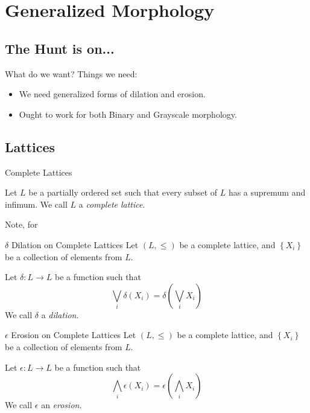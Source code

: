 \documentclass{beamer}
\newcommand{\set}[1]{\left\lbrace #1 \right\rbrace}
\newcommand{\func}[3]{#1:#2\rightarrow#3}
\newcommand{\meet}[1]{\bigwedge_{#1}}
\newcommand{\join}[1]{\bigvee_{#1}}
\newcommand{\unidilate}{\delta}
\newcommand{\unierode}{\epsilon}
\newcommand{\partialless}{\leqslant}
\begin{document}
\section{Generalized Morphology}
\subsection{The Hunt is on...}
\begin{frame}{What do we want?}
  Things we need:
  \begin{itemize}
    \item We need generalized forms of dilation and erosion.
    \item Ought to work for both Binary and Grayscale morphology.
  \end{itemize} 
\end{frame}

\subsection{Lattices}
\begin{frame}{Complete Lattices}
  \begin{definition}
    Let $L$ be a partially ordered set such that 
    every subset of $L$ has a supremum and infimum. 
    We call $L$ a \emph{complete lattice}.
  \end{definition}
  Note, for 
\end{frame}
\begin{frame}{$\unidilate$ Dilation on Complete Lattices}
   Let $(L, \partialless)$ be a complete lattice, and $\set{X_i}$ be
   a collection of elements from $L$.
   \begin{definition}
     Let $\func{\unidilate}{L}{L}$ be a function such that
       $$\join{i} \unidilate(X_i) = 
         \unidilate\left(\join{i}X_i\right)$$
     We call $\unidilate$ a \emph{dilation}.
   \end{definition}
\end{frame}

\begin{frame}{$\unierode$ Erosion on Complete Lattices}
   Let $(L, \partialless)$ be a complete lattice, and $\set{X_i}$ be
   a collection of elements from $L$.
   \begin{definition}
     Let $\func{\unierode}{L}{L}$ be a function such that
       $$\meet{i} \unierode(X_i) = 
         \unierode\left(\meet{i}X_i\right)$$
     We call $\unierode$ an \emph{erosion}.
   \end{definition}
\end{frame}
\end{document}
